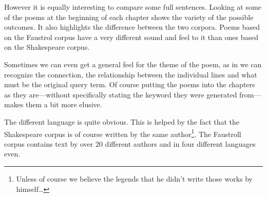 \spirals

However it is equally interesting to compare some full sentences.
Looking at some of the poems at the beginning of each chapter shows the variety of the possible outcomes. It also highlights the difference between the two corpora. Poems based on the Faustrol corpus have a very different sound and feel to it than ones based on the Shakespeare corpus.

Sometimes we can even get a general feel for the theme of the poem, as in we can recognize the connection, the relationship between the individual lines and what must be the original query term. Of course putting the poems into the chapters as they are---without specifically stating the keyword they were generated from---makes them a bit more elusive.

The different language is quite obvious. This is helped by the fact that the Shakespeare corpus is of course written by the same author\footnote{Unless of course we believe the legends that he didn't write those works by himself\ldots}. The Faustroll corpus contains text by over 20 different authors and in four different languages even.

